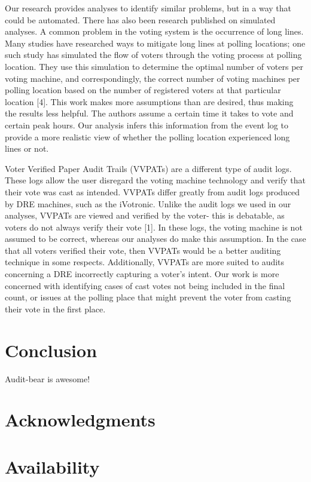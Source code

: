 \documentclass[letterpaper,twocolumn,10pt]{article}
\begin{document}
Our research provides analyses to identify similar problems, but in a way that could be automated.  There has also been research published on simulated analyses.  A common problem in the voting system is the occurrence of long lines.  Many studies have researched ways to mitigate long lines at polling locations; one such study has simulated the flow of voters through the voting process at polling location.  They use this simulation to determine the optimal number of voters per voting machine, and correspondingly, the correct number of voting machines per polling location based on the number of registered voters at that particular location [4].  This work makes more assumptions than are desired, thus making the results less helpful.  The authors assume a certain time it takes to vote and certain peak hours.  Our analysis infers this information from the event log to provide a more realistic view of whether the polling location experienced long lines or not.

Voter Verified Paper Audit Trails (VVPATs) are a different type of audit logs.  These logs allow the user disregard the voting machine technology and verify that their vote was cast as intended.  VVPATs differ greatly from audit logs produced by DRE machines, such as the iVotronic.  Unlike the audit logs we used in our analyses, VVPATs are viewed and verified by the voter- this is debatable, as voters do not always verify their vote [1].  In these logs, the voting machine is not assumed to be correct, whereas our analyses do make this assumption.  In the case that all voters verified their vote, then VVPATs would be a better auditing technique in some respects.  Additionally, VVPATs are more suited to audits concerning a DRE incorrectly capturing a voter’s intent.  Our work is more concerned with identifying cases of cast votes not being included in the final count, or issues at the polling place that might prevent the voter from casting their vote in the first place.

\section{Conclusion}
Audit-bear is awesome!

\section{Acknowledgments}
\section{Availability}



\end{document}
